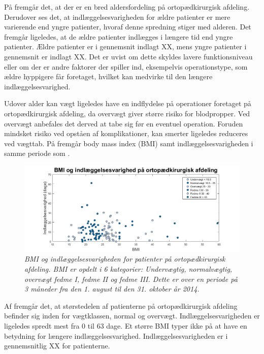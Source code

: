 \noindent
På  fremgår det, at der er en bred aldersfordeling på ortopædkirurgisk afdeling. Derudover ses det, at indlæggelsesvarigheden for ældre patienter er mere varierende end yngre patienter, hvoraf denne spredning stiger med alderen. Det fremgår ligeledes, at de ældre patienter indlægges i længere tid end yngre patienter. Ældre patienter er i gennemsnit indlagt XX, mens yngre patienter i gennemsnit er indlagt XX. Det er uvist om dette skyldes lavere funktionsniveau eller om der er andre faktorer der spiller ind, eksempelvis operationstype, som ældre hyppigere får foretaget, hvilket kan medvirke til den længere indlæggelsesvarighed.


Udover alder kan vægt ligeledes have en indflydelse på operationer foretaget på ortopædkirurgisk afdeling, da overvægt giver større risiko for blodpropper\cite{Ermonds2004}. Ved overvægt anbefales det derved at tabe sig før en eventuel operation. Foruden mindsket risiko ved opståen af komplikationer, kan smerter ligeledes reduceres ved vægttab.\cite{Nordjylland2014} På  fremgår body mass index (BMI) samt indlæggelsesvarigheden i samme periode som .

\begin{figure}[H]
	\centering
	\includegraphics[scale=0.6]{figures/BMIogindlaeg}
	\caption{\textit{BMI og indlæggelsesvarigheden for patienter på ortopædkirurgisk afdeling. BMI er opdelt i 6 kategorier: Undervægtig, normalvægtig, overvægt fedme I, fedme II og fedme III. Dette er over en periode på 3 måneder fra den 1. august til den 31. oktober år 2014.}}
	\label{BMIogindlaeggelse}
\end{figure}


\noindent
Af  fremgår det, at størstedelen af patienterne på ortopædkirurgisk afdeling befinder sig inden for vægtklassen, normal og overvægt. Indlæggelsesvarigheden er ligeledes spredt mest fra 0 til 63 dage. 
Et større BMI typer ikke på at have en betydning for længere indlæggelsesvarighed. Indlæggelsesvarigheden er i gennemsnitlig XX for patienterne. 


